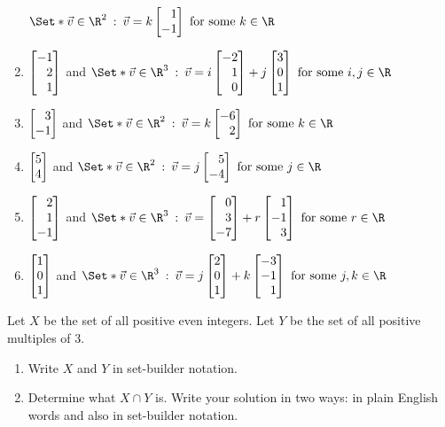 \begin{exercises}
\begin{problist}
\begin{enumerate}
					$\Set*{\vv\in\R^2 \given
					\vv=k\mat{1\\-1}\text{ for some }k\in\R}$
				\item $\mat{-1 \\ 2 \\ 1}$ and
					$\Set*{\vv\in\R^3\given
						\vv=i\mat{-2 \\ 1 \\ 0} +j\mat{3 \\ 0 \\ 1}
						\text{ for some }i,j\in\R
					}$
					\item
						$\mat{3 \\ -1}$ and $\Set*{ \vv\in\R^2\given
							\vv=k\mat{-6 \\ 2}\text{ for some } k\in\R
						}$
					\item
						$\mat{5 \\ 4}$ and
						$\Set*{\vv\in\R^2\given
							\vv=j\mat{5 \\ -4}\text{ for some }j\in\R
						}$
					\item $\mat{2 \\ 1 \\ -1}$ and
						$\Set*{\vv\in\R^3
							\given \vv= \mat{0 \\ 3 \\ -7} +r\mat{1 \\ -1 \\ 3}
							\text{ for some }r\in\R
						}$
					\item $\mat{1 \\ 0 \\ 1}$ and
						$\Set*{\vv\in\R^3\given
							\vv= j\mat{2 \\ 0 \\ 1} +k\mat{-3 \\ -1 \\ 1}
							\text{ for some }j,k\in\R
						}$
			\end{enumerate}
		\prob
			Let $X$ be the set of all positive even integers. Let $Y$ be the set of
			all positive multiples of $3$.
			\begin{enumerate}
				\item Write $X$ and $Y$ in set-builder notation.
				\item Determine what $X\cap Y$ is. Write your solution in two ways: in
					plain English words and also in set-builder notation.
			\end{enumerate}
		\prob

\end{problist}
\end{exercises}

